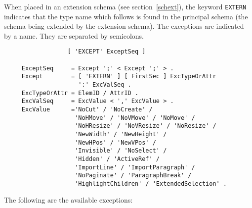 When placed in an extension schema (see section~\ref{schext}), the
keyword {\tt EXTERN} indicates that the type name which follows is
found in the principal schema (the schema being extended by the
extension schema).  The exceptions are indicated by a name.  They
are separated by semicolons.

\begin{verbatim}
                  [ 'EXCEPT' ExceptSeq ]

     ExceptSeq     = Except ';' < Except ';' > .
     Except        = [ 'EXTERN' ] [ FirstSec ] ExcTypeOrAttr
                     ':' ExcValSeq .
     ExcTypeOrAttr = ElemID / AttrID .
     ExcValSeq     = ExcValue < ',' ExcValue > .
     ExcValue      ='NoCut' / 'NoCreate' /
                    'NoHMove' / 'NoVMove' / 'NoMove' /
                    'NoHResize' / 'NoVResize' / 'NoResize' /
                    'NewWidth' / 'NewHeight' /
                    'NewHPos' / 'NewVPos' /
                    'Invisible' / 'NoSelect' /
                    'Hidden' / 'ActiveRef' /
                    'ImportLine' / 'ImportParagraph' /
                    'NoPaginate' / 'ParagraphBreak' /
                    'HighlightChildren' / 'ExtendedSelection' .
\end{verbatim}

The following are the available exceptions:

